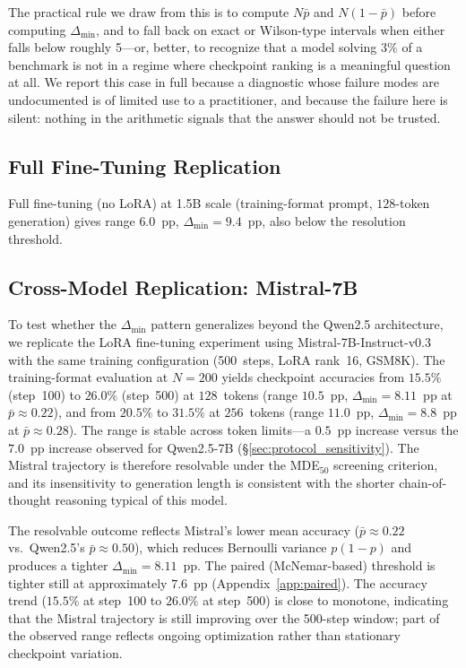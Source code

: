 \documentclass[pdflatex,sn-mathphys-ay,oneside]{sn-jnl}
\theoremstyle{thmstylethree}
\begin{document}
The practical rule we draw from this is to compute $N\bar p$ and $N(1-\bar p)$ before computing $\Delta_{\min}$, and to fall back on exact or Wilson-type intervals when either falls below roughly 5---or, better, to recognize that a model solving $3\%$ of a benchmark is not in a regime where checkpoint ranking is a meaningful question at all. We report this case in full because a diagnostic whose failure modes are undocumented is of limited use to a practitioner, and because the failure here is silent: nothing in the arithmetic signals that the answer should not be trusted.

\subsection{Full Fine-Tuning Replication}\label{sec:full_ft}

Full fine-tuning (no LoRA) at 1.5B scale (training-format prompt, $128$-token generation) gives range $6.0$~pp, $\Delta_{\min}=9.4$~pp, also below the resolution threshold.

\subsection{Cross-Model Replication: Mistral-7B}\label{sec:mistral}

To test whether the $\Delta_{\min}$ pattern generalizes beyond the Qwen2.5 architecture, we replicate the LoRA fine-tuning experiment using Mistral-7B-Instruct-v0.3~\citep{jiang2023mistral} with the same training configuration (500~steps, LoRA rank~16, GSM8K). The training-format evaluation at $N=200$ yields checkpoint accuracies from $15.5\%$ (step~100) to $26.0\%$ (step~500) at $128$~tokens (range $10.5$~pp, $\Delta_{\min}=8.11$~pp at $\bar{p}\approx0.22$), and from $20.5\%$ to $31.5\%$ at $256$~tokens (range $11.0$~pp, $\Delta_{\min}=8.8$~pp at $\bar{p}\approx0.28$). The range is stable across token limits---a $0.5$~pp increase versus the $7.0$~pp increase observed for Qwen2.5-7B (\S\ref{sec:protocol_sensitivity}). The Mistral trajectory is therefore resolvable under the MDE$_{50}$ screening criterion, and its insensitivity to generation length is consistent with the shorter chain-of-thought reasoning typical of this model.

The resolvable outcome reflects Mistral's lower mean accuracy ($\bar{p}\approx0.22$ vs.\ Qwen2.5's $\bar{p}\approx0.50$), which reduces Bernoulli variance $p(1-p)$ and produces a tighter $\Delta_{\min}=8.11$~pp. The paired (McNemar-based) threshold is tighter still at approximately $7.6$~pp (Appendix~\ref{app:paired}). The accuracy trend ($15.5\%$ at step~100 to $26.0\%$ at step~500) is close to monotone, indicating that the Mistral trajectory is still improving over the 500-step window; part of the observed range reflects ongoing optimization rather than stationary checkpoint variation.
\end{document}
